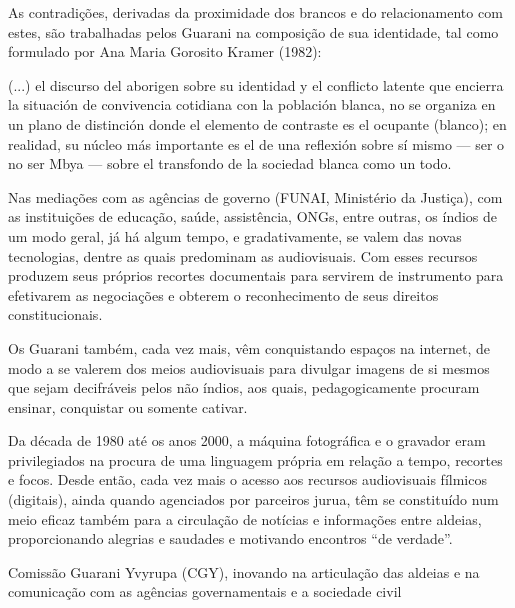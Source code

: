 \documentclass{article}
\begin{document}
As contradi\c{c}\~oes, derivadas da proximidade dos brancos e do
relacionamento com estes, s\~ao trabalhadas pelos Guarani na 
composi\c{c}\~ao de sua identidade, tal como formulado por Ana Maria
Gorosito Kramer (1982):  

(...) el discurso del aborigen sobre su identidad y el conflicto latente
que encierra la situaci\'on de convivencia cotidiana con la poblaci\'on
blanca, no se organiza en un plano de distinci\'on donde el elemento de
contraste es el ocupante (blanco); en realidad, su n\'ucleo m\'as
importante es el de una reflexi\'on sobre s\'i mismo --- ser o no ser
Mbya --- sobre el transfondo de la sociedad blanca como un todo.  

Nas media\c{c}\~oes com as ag\^encias de governo (FUNAI, Minist\'erio da
Justi\c{c}a), com as institui\c{c}\~oes de educa\c{c}\~ao, sa\'ude,
assist\^encia, ONGs, entre outras, os \'indios de um modo geral, j\'a
h\'a algum tempo, e gradativamente, se valem das novas tecnologias,
dentre as quais predominam as audiovisuais. Com esses recursos produzem
seus pr\'oprios recortes documentais para servirem de instrumento para
efetivarem as negocia\c{c}\~oes e obterem o reconhecimento de seus
direitos constitucionais.

Os Guarani tamb\'em, cada vez mais, v\^em conquistando espa\c{c}os na
internet, de modo a se valerem dos meios audiovisuais para divulgar
imagens de si mesmos que sejam decifr\'aveis pelos n\~ao \'indios, aos
quais, pedagogicamente procuram ensinar, conquistar ou somente cativar.


Da d\'ecada de 1980 at\'e os anos 2000, a m\'aquina fotogr\'afica e o
gravador eram privilegiados na procura de uma linguagem pr\'opria em
rela\c{c}\~ao a tempo, recortes e focos. Desde ent\~ao, cada vez mais o
acesso aos recursos audiovisuais f\'ilmicos (digitais), ainda quando
agenciados por parceiros jurua, t\^em se constitu\'ido num meio eficaz
tamb\'em para a circula\c{c}\~ao de not\'icias e informa\c{c}\~oes
entre aldeias, proporcionando alegrias e saudades e motivando encontros
{\textquotedblleft}de verdade{\textquotedblright}.

Comiss\~ao Guarani Yvyrupa (CGY), inovando na articula\c{c}\~ao das
aldeias e na comunica\c{c}\~ao com as ag\^encias governamentais e a
sociedade civil
\end{document}
